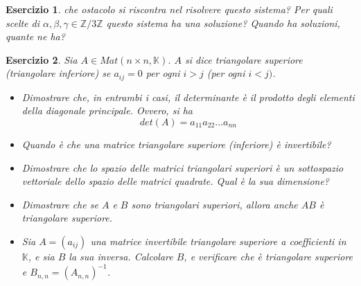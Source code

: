 \documentclass{article}
\newtheorem{es}{Esercizio}
\begin{document}
{\begin{es}
che ostacolo si riscontra nel risolvere questo sistema? Per quali scelte di $\alpha,\beta,\gamma\in \mathbb{Z}/3\mathbb{Z}$ questo sistema ha una soluzione? Quando ha soluzioni, quante ne ha?



\end{es}


\begin{es}
    Sia $A\in Mat(n \times n,\mathbb{K})$. $A$ si dice triangolare superiore (triangolare inferiore) se $a_{ij}=0$ per ogni $i>j$ (per ogni $i<j)$. 
    \begin{itemize}
        \item Dimostrare che, in entrambi i casi, il determinante è il prodotto degli elementi della diagonale principale. Ovvero, si ha $$det(A)=a_{11}a_{22}...a_{nn}$$
        \item Quando è che una matrice triangolare superiore (inferiore) è invertibile?
        \item Dimostrare che lo spazio delle matrici triangolari superiori è un sottospazio vettoriale dello spazio delle matrici quadrate. Qual è la sua dimensione?
        \item Dimostrare che se $A$ e $B$ sono triangolari superiori, allora anche $AB$ è triangolare superiore.
        \item Sia $A=(a_{ij})$ una matrice invertibile triangolare superiore a coefficienti in $\mathbb{K}$, e sia $B$ la sua inversa. Calcolare $B$, e verificare che è triangolare superiore e $B_{n,n}=(A_{n,n})^{-1}$.
    \end{itemize}
\end{es}


}
\end{document}
